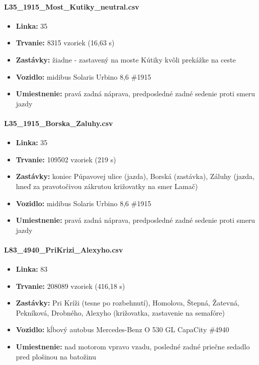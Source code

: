 \paragraph{L35\_1915\_Most\_Kutiky\_neutral.csv}
	\begin{itemize}[noitemsep, topsep=0pt]
  	\item \textbf{Linka:} 35
  	\item \textbf{Trvanie:} 8315 vzoriek (16,63 s)
  	\item \textbf{Zastávky:} žiadne - zastavený na moste Kútiky kvôli prekážke na ceste
  	\item \textbf{Vozidlo:} midibus Solaris Urbino 8,6 \#1915
  	\item \textbf{Umiestnenie:} pravá zadná náprava, predposledné zadné sedenie proti smeru jazdy
  	\end{itemize}
  
\paragraph{L35\_1915\_Borska\_Zaluhy.csv}
	\begin{itemize}[noitemsep, topsep=0pt]
  	\item \textbf{Linka:} 35
  	\item \textbf{Trvanie:} 109502 vzoriek (219 s)
  	\item \textbf{Zastávky:} koniec Púpavovej ulice (jazda), Borská (zastávka), Záluhy (jazda, hneď za pravotočivou zákrutou križovatky na smer Lamač)
  	\item \textbf{Vozidlo:} midibus Solaris Urbino 8,6 \#1915
  	\item \textbf{Umiestnenie:} pravá zadná náprava, predposledné zadné sedenie proti smeru jazdy
  	\end{itemize}
  
\paragraph{L83\_4940\_PriKrizi\_Alexyho.csv}
	\begin{itemize}[noitemsep, topsep=0pt]
  	\item \textbf{Linka:} 83
  	\item \textbf{Trvanie:} 208089 vzoriek (416,18 s)
  	\item \textbf{Zastávky:} Pri Kríži (tesne po rozbehnutí), Homolova, Štepná, Žatevná, Pekníková, Drobného, Alexyho (križovatka, zastavenie na semafóre)
  	\item \textbf{Vozidlo:} kĺbový autobus Mercedes-Benz O 530 GL CapaCity \#4940
  	\item \textbf{Umiestnenie:} nad motorom vpravo vzadu, posledné zadné priečne sedadlo pred plošinou na batožinu
  	\end{itemize}
  

